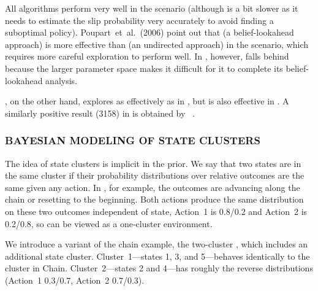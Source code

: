 \begin{table}
\caption{Cumulative reward in ~\cite{asmuth09}}
\label{t:chain}
\end{table}

All algorithms perform very well in the  scenario (although
 is a bit slower as it needs to estimate the slip probability
very accurately to avoid finding a suboptimal policy).
Poupart~et~al.~(2006) point out that  (a belief-lookahead
approach) is more effective than  (an undirected approach) in
the  scenario, which requires more careful exploration to perform
well.  In , however,  falls behind because the larger
parameter space makes it difficult for it to complete its
belief-lookahead analysis.

, on the other hand, explores as effectively as  in ,
but is also effective in .  A similarly positive result (3158) in  is
obtained by ~\cite{strens00}.

\subsubsection{BAYESIAN MODELING OF STATE CLUSTERS}
\label{s:cluster}

The idea of state clusters is implicit in the  prior.
We say that two states are in the same cluster if
their probability distributions over relative outcomes are the same
given any action.  In , for example, the outcomes are advancing along the
chain or resetting to the beginning.  Both actions produce the
same distribution on these two outcomes independent of state, Action~1
is 0.8/0.2 and Action~2 is 0.2/0.8, so  can be viewed as a
one-cluster environment.

We introduce a variant of the chain example, the two-cluster ,
which includes an additional state cluster.  Cluster~1---states 1, 3,
and 5---behaves identically to the cluster in Chain.
Cluster~2---states 2 and 4---has roughly the reverse
distributions (Action~1 0.3/0.7, Action~2 0.7/0.3).

